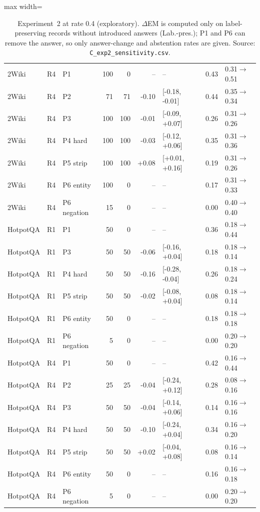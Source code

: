 \begin{table}[t]
\begin{adjustbox}{max width=\linewidth}
\begin{tabular}{@{}lllrrrlrl@{}}
\midrule
2Wiki & R4 & P1 & 100 & 0 & -- & -- & 0.43 & 0.31$\to$0.51 \\
2Wiki & R4 & P2 & 71 & 71 & -0.10 & [-0.18, -0.01] & 0.44 & 0.35$\to$0.34 \\
2Wiki & R4 & P3 & 100 & 100 & -0.01 & [-0.09, +0.07] & 0.26 & 0.31$\to$0.26 \\
2Wiki & R4 & P4 hard & 100 & 100 & -0.03 & [-0.12, +0.06] & 0.35 & 0.31$\to$0.36 \\
2Wiki & R4 & P5 strip & 100 & 100 & +0.08 & [+0.01, +0.16] & 0.19 & 0.31$\to$0.26 \\
2Wiki & R4 & P6 entity & 100 & 0 & -- & -- & 0.17 & 0.31$\to$0.33 \\
2Wiki & R4 & P6 negation & 15 & 0 & -- & -- & 0.00 & 0.40$\to$0.40 \\
\midrule
HotpotQA & R1 & P1 & 50 & 0 & -- & -- & 0.36 & 0.18$\to$0.44 \\
HotpotQA & R1 & P3 & 50 & 50 & -0.06 & [-0.16, +0.04] & 0.18 & 0.18$\to$0.14 \\
HotpotQA & R1 & P4 hard & 50 & 50 & -0.16 & [-0.28, -0.04] & 0.26 & 0.18$\to$0.24 \\
HotpotQA & R1 & P5 strip & 50 & 50 & -0.02 & [-0.08, +0.04] & 0.08 & 0.18$\to$0.14 \\
HotpotQA & R1 & P6 entity & 50 & 0 & -- & -- & 0.18 & 0.18$\to$0.18 \\
HotpotQA & R1 & P6 negation & 5 & 0 & -- & -- & 0.00 & 0.20$\to$0.20 \\
\midrule
HotpotQA & R4 & P1 & 50 & 0 & -- & -- & 0.42 & 0.16$\to$0.44 \\
HotpotQA & R4 & P2 & 25 & 25 & -0.04 & [-0.24, +0.12] & 0.28 & 0.08$\to$0.16 \\
HotpotQA & R4 & P3 & 50 & 50 & -0.04 & [-0.14, +0.06] & 0.14 & 0.16$\to$0.16 \\
HotpotQA & R4 & P4 hard & 50 & 50 & -0.10 & [-0.24, +0.04] & 0.34 & 0.16$\to$0.20 \\
HotpotQA & R4 & P5 strip & 50 & 50 & +0.02 & [-0.04, +0.08] & 0.08 & 0.16$\to$0.14 \\
HotpotQA & R4 & P6 entity & 50 & 0 & -- & -- & 0.16 & 0.16$\to$0.18 \\
HotpotQA & R4 & P6 negation & 5 & 0 & -- & -- & 0.00 & 0.20$\to$0.20 \\
\bottomrule
\end{tabular}
\end{adjustbox}
\caption{Experiment~2 at rate 0.4 (exploratory). $\Delta$EM is computed only on label-preserving records without introduced answers (Lab.-pres.); P1 and P6 can remove the answer, so only answer-change and abstention rates are given. Source: \texttt{C\_exp2\_sensitivity.csv}.}
\label{tab:exp2}
\end{table}
